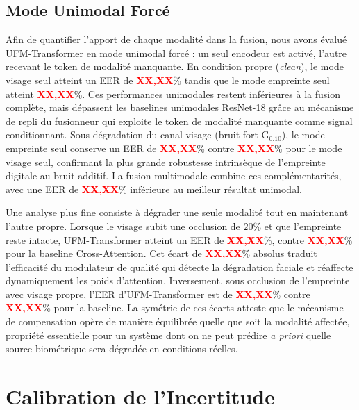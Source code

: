 \documentclass[12pt,a4paper]{report}
\begin{document}
\subsection{Mode Unimodal Forc\'{e}}

Afin de quantifier l'apport de chaque modalit\'{e} dans la fusion, nous avons \'{e}valu\'{e} UFM-Transformer en mode unimodal forc\'{e} : un seul encodeur est activ\'{e}, l'autre recevant le token de modalit\'{e} manquante. En condition propre (\textit{clean}), le mode visage seul atteint un EER de \textcolor{red}{\textbf{XX,XX}}\% tandis que le mode empreinte seul atteint \textcolor{red}{\textbf{XX,XX}}\%. Ces performances unimodales restent inf\'{e}rieures \`{a} la fusion compl\`{e}te, mais d\'{e}passent les baselines unimodales ResNet-18 gr\^{a}ce au m\'{e}canisme de repli du fusionneur qui exploite le token de modalit\'{e} manquante comme signal conditionnant. Sous d\'{e}gradation du canal visage (bruit fort G$_{0.10}$), le mode empreinte seul conserve un EER de \textcolor{red}{\textbf{XX,XX}}\% contre \textcolor{red}{\textbf{XX,XX}}\% pour le mode visage seul, confirmant la plus grande robustesse intrins\`{e}que de l'empreinte digitale au bruit additif. La fusion multimodale combine ces compl\'{e}mentarit\'{e}s, avec une EER de \textcolor{red}{\textbf{XX,XX}}\% inf\'{e}rieure au meilleur r\'{e}sultat unimodal.

Une analyse plus fine consiste \`{a} d\'{e}grader une seule modalit\'{e} tout en maintenant l'autre propre. Lorsque le visage subit une occlusion de $20\%$ et que l'empreinte reste intacte, UFM-Transformer atteint un EER de \textcolor{red}{\textbf{XX,XX}}\%, contre \textcolor{red}{\textbf{XX,XX}}\% pour la baseline Cross-Attention. Cet \'{e}cart de \textcolor{red}{\textbf{XX,XX}}\% absolus traduit l'efficacit\'{e} du modulateur de qualit\'{e} qui d\'{e}tecte la d\'{e}gradation faciale et r\'{e}affecte dynamiquement les poids d'attention. Inversement, sous occlusion de l'empreinte avec visage propre, l'EER d'UFM-Transformer est de \textcolor{red}{\textbf{XX,XX}}\% contre \textcolor{red}{\textbf{XX,XX}}\% pour la baseline. La sym\'{e}trie de ces \'{e}carts atteste que le m\'{e}canisme de compensation op\`{e}re de mani\`{e}re \'{e}quilibr\'{e}e quelle que soit la modalit\'{e} affect\'{e}e, propri\'{e}t\'{e} essentielle pour un syst\`{e}me dont on ne peut pr\'{e}dire \textit{a priori} quelle source biom\'{e}trique sera d\'{e}grad\'{e}e en conditions r\'{e}elles.

\section{Calibration de l'Incertitude}
\label{sec:calibration}
\end{document}
